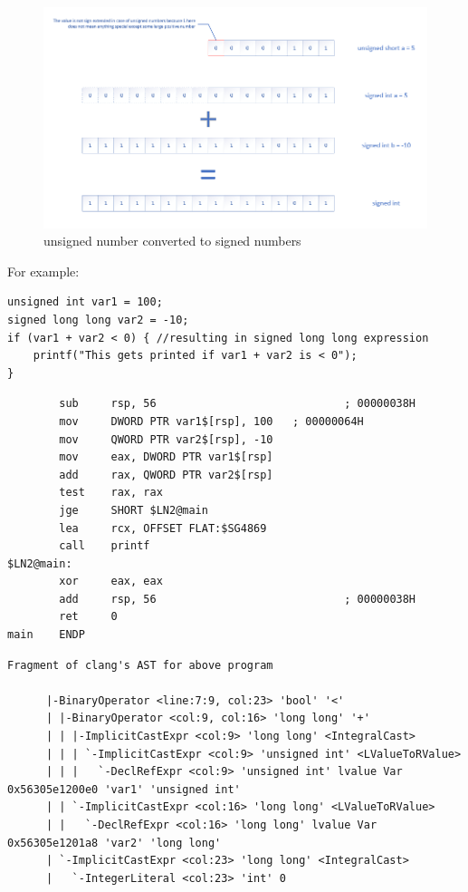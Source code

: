 \documentclass{article}
\begin{document}
\begin{figure}[H]
\centering
\includegraphics[width=\textwidth]{unsigned-short-to-signed-int.png}
\caption{unsigned number converted to signed numbers}
\end{figure}

For example:
\begin{verbatim}
unsigned int var1 = 100;
signed long long var2 = -10;
if (var1 + var2 < 0) { //resulting in signed long long expression
    printf("This gets printed if var1 + var2 is < 0");
}
\end{verbatim}
\begin{verbatim}
        sub     rsp, 56                             ; 00000038H
        mov     DWORD PTR var1$[rsp], 100   ; 00000064H
        mov     QWORD PTR var2$[rsp], -10
        mov     eax, DWORD PTR var1$[rsp]
        add     rax, QWORD PTR var2$[rsp]
        test    rax, rax
        jge     SHORT $LN2@main
        lea     rcx, OFFSET FLAT:$SG4869
        call    printf
$LN2@main:
        xor     eax, eax
        add     rsp, 56                             ; 00000038H
        ret     0
main    ENDP
\end{verbatim}
\begin{verbatim}
Fragment of clang's AST for above program

      |-BinaryOperator <line:7:9, col:23> 'bool' '<'
      | |-BinaryOperator <col:9, col:16> 'long long' '+'
      | | |-ImplicitCastExpr <col:9> 'long long' <IntegralCast>
      | | | `-ImplicitCastExpr <col:9> 'unsigned int' <LValueToRValue>
      | | |   `-DeclRefExpr <col:9> 'unsigned int' lvalue Var 0x56305e1200e0 'var1' 'unsigned int'
      | | `-ImplicitCastExpr <col:16> 'long long' <LValueToRValue>
      | |   `-DeclRefExpr <col:16> 'long long' lvalue Var 0x56305e1201a8 'var2' 'long long'
      | `-ImplicitCastExpr <col:23> 'long long' <IntegralCast>
      |   `-IntegerLiteral <col:23> 'int' 0
\end{verbatim}
\end{document}
